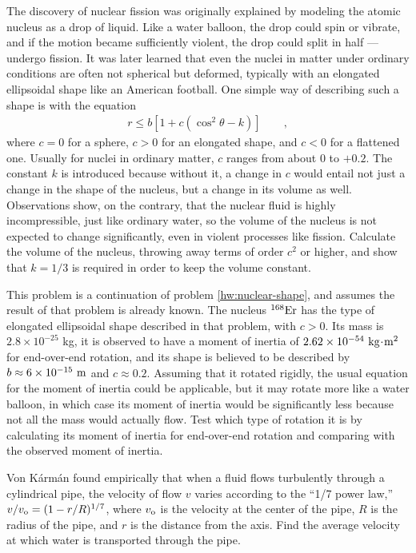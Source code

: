 \begin{hwsection}
\begin{hw}\label{hw:nuclear-shape}
The discovery of nuclear fission
was originally explained by modeling the atomic nucleus as
a drop of liquid. Like a water balloon, the drop could spin or vibrate, and if the motion became
sufficiently violent, the drop could split in half --- undergo fission. It was later learned that
even the nuclei in matter under ordinary conditions are often not
spherical but deformed, typically with an elongated ellipsoidal shape like an American football.
One simple way of describing such a shape is with the equation
\begin{align*}
  r \le b[1+c(\cos^2\theta-k)] \qquad ,
\end{align*}
where $c=0$ for a sphere, $c>0$ for an elongated shape, and $c<0$ for a flattened one.
Usually for nuclei in ordinary matter, $c$ ranges from about 0 to $+0.2$. The constant
$k$ is introduced because without it, a change in $c$ would entail not just a change in
the shape of the nucleus, but a change in its volume as well. Observations show, on the
contrary, that the nuclear fluid is highly incompressible, just like ordinary water, so the
volume of the nucleus is not expected to change significantly, even in violent processes
like fission. Calculate the volume of the nucleus, throwing away terms of order $c^2$
or higher, and show that $k=1/3$ is required in order to keep the volume constant.
\end{hw}

\begin{hw}[2]
This problem is a continuation of problem \ref{hw:nuclear-shape}, and assumes the result of that problem
is already known.
The nucleus $^{168}\textup{Er}$ has the type of elongated ellipsoidal shape described in that
problem, with $c>0$. Its mass is
$2.8\times10^{-25}$ kg, it is observed to have a moment of inertia of $2.62\times10^{-54}\ \textup{kg}\!\cdot\!\textup{m}^2$
for end-over-end rotation, and its shape is believed to be described by $b\approx 6\times10^{-15}\ \textup{m}$ and $c\approx 0.2$.
Assuming that it rotated rigidly, the usual equation for the moment of inertia could be applicable, but
it may rotate more like a water balloon, in which case its moment of inertia would be significantly less because
not all the mass would actually flow. Test which type of rotation it is by calculating its moment of inertia for end-over-end
rotation and comparing with the observed moment of inertia.
\end{hw}

\begin{hw}
Von K\'arm\'an found empirically that when a fluid flows turbulently through a cylindrical pipe, the
velocity of flow $v$ varies according to the ``1/7 power law,'' $v/v_{\textup{o}}=(1-r/R)^{1/7}$, where
$v_{\textup{o}}$ is the velocity at the center of the pipe, $R$ is the radius of the pipe, and $r$ is the
distance from the axis. Find the average velocity at which water is transported through the pipe.
\end{hw}

\end{hwsection}
